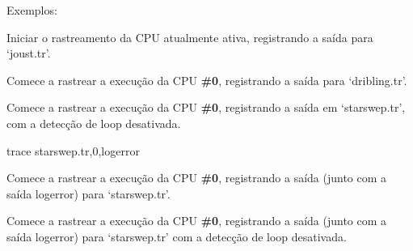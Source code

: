 \documentclass[letterpaper,10pt,brazil]{sphinxmanual}
\begin{document}
\begin{DUlineblock}{0em}
\item[] Exemplos:
\item[] 
\item[]
\begin{DUlineblock}{\DUlineblockindent}
\item[] 
\item[] 
\end{DUlineblock}
\item[] Iniciar o rastreamento da CPU atualmente ativa, registrando a saída para `joust.tr'.
\item[] 
\item[]
\begin{DUlineblock}{\DUlineblockindent}
\item[] 
\item[] 
\end{DUlineblock}
\item[] Comece a rastrear a execução da CPU \textbf{\#0}, registrando a saída para `dribling.tr'.
\item[] 
\item[]
\begin{DUlineblock}{\DUlineblockindent}
\item[] 
\item[] 
\end{DUlineblock}
\item[] Comece a rastrear a execução da CPU \textbf{\#0}, registrando a saída em `starswep.tr', com a detecção de loop desativada.
\item[] 
\item[]
\begin{DUlineblock}{\DUlineblockindent}
\item[] trace starswep.tr,0,logerror
\item[] 
\end{DUlineblock}
\item[] Comece a rastrear a execução da CPU \textbf{\#0}, registrando a saída (junto com a saída logerror) para `starswep.tr'.
\item[] 
\item[]
\begin{DUlineblock}{\DUlineblockindent}
\item[] 
\item[] 
\end{DUlineblock}
\item[] Comece a rastrear a execução da CPU \textbf{\#0}, registrando a saída (junto com a saída logerror) para `starswep.tr' com a detecção de loop desativada.

\end{DUlineblock}
\end{document}

